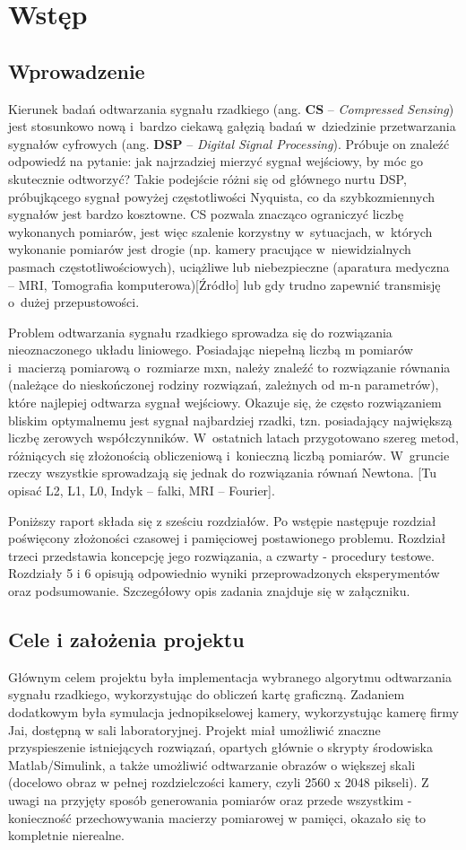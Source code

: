 \section{Wstęp}
\subsection{Wprowadzenie}
Kierunek badań odtwarzania sygnału rzadkiego (ang. \textbf{CS} – \textit{Compressed Sensing}) jest stosunkowo nową i bardzo ciekawą gałęzią badań w~dziedzinie przetwarzania sygnałów cyfrowych (ang. \textbf{DSP} – \textit{Digital Signal Processing}). Próbuje on znaleźć odpowiedź na pytanie: jak najrzadziej mierzyć sygnał wejściowy, by móc go skutecznie odtworzyć? Takie podejście różni się od głównego nurtu DSP, próbujkącego sygnał powyżej częstotliwości Nyquista, co da szybkozmiennych sygnałów jest bardzo kosztowne. CS pozwala znacząco ograniczyć liczbę wykonanych pomiarów, jest więc szalenie korzystny  w~sytuacjach, w~których wykonanie pomiarów jest drogie (np. kamery pracujące w niewidzialnych pasmach częstotliwościowych), uciążliwe lub niebezpieczne (aparatura medyczna – MRI, Tomografia komputerowa)[Źródło] lub gdy trudno zapewnić transmisję o~dużej przepustowości. 

Problem odtwarzania sygnału rzadkiego sprowadza się do rozwiązania nieoznaczonego układu liniowego. Posiadając niepełną liczbą m pomiarów i~macierzą pomiarową o~rozmiarze mxn, należy znaleźć to rozwiązanie równania (należące do nieskończonej rodziny rozwiązań, zależnych od m-n parametrów), które najlepiej odtwarza sygnał wejściowy. Okazuje się, że często rozwiązaniem bliskim optymalnemu jest sygnał najbardziej rzadki, tzn. posiadający największą liczbę zerowych współczynników. W~ostatnich latach przygotowano szereg metod, różniących się złożonością obliczeniową i~konieczną liczbą pomiarów. W~gruncie rzeczy wszystkie sprowadzają się jednak do rozwiązania równań Newtona.  [Tu opisać L2, L1, L0, Indyk – falki, MRI – Fourier].

Poniższy raport składa się z sześciu rozdziałów. Po wstępie następuje rozdział poświęcony złożoności czasowej i pamięciowej postawionego problemu. Rozdział trzeci przedstawia koncepcję jego rozwiązania, a czwarty - procedury testowe. Rozdziały 5 i 6 opisują odpowiednio wyniki przeprowadzonych eksperymentów oraz podsumowanie. Szczegółowy opis zadania znajduje się w załączniku.
\subsection{Cele i założenia projektu}
Głównym celem projektu była implementacja wybranego algorytmu odtwarzania sygnału rzadkiego, wykorzystując do obliczeń kartę graficzną. Zadaniem dodatkowym była symulacja jednopikselowej kamery, wykorzystując kamerę firmy Jai, dostępną w sali laboratoryjnej. Projekt miał umożliwić znaczne przyspieszenie istniejących rozwiązań, opartych głównie o skrypty środowiska Matlab/Simulink, a także umożliwić odtwarzanie obrazów o większej skali (docelowo obraz w pełnej rozdzielczości kamery, czyli 2560 x 2048 pikseli). Z uwagi na przyjęty sposób generowania pomiarów oraz przede wszystkim - konieczność przechowywania macierzy pomiarowej w pamięci, okazało się to kompletnie nierealne.

